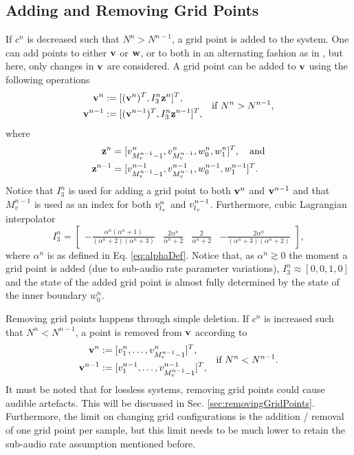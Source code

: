 \documentclass[fleqn]{jaes}
\begin{document}
\subsection{Adding and Removing Grid Points}\label{sec:addRemove}
If $c^n$ is decreased such that $N^n > N^{n-1}$, a grid point is added to the system. One can add points to either $\mathbf{v}$ or $\mathbf{w}$, or to both in an alternating fashion as in \cite{Willemsen2021a}, but here, only changes in $\mathbf{v}$ are considered. A grid point can be added to $\mathbf{v}$ using the following operations
\begin{equation}
\begin{aligned}
    \v^n &:= [(\v^n)^T, I_3^n\z^n]^T,\\
    \v^{n-1} &:= [(\v^{n-1})^T, I_3^n\z^{n-1}]^T,\\
\end{aligned} \quad \text{if } N^n > N^{n-1},
\end{equation}
where
\begin{equation*}
    \begin{aligned}
        \z^n &= [v_{M_v^{n-1}-1}^n, v_{M_v^{n-1}}^n, w_0^n, w_1^n]^T, \quad \text{and}\\
        \z^{n-1} &= [v_{M_v^{n-1}-1}^{n-1}, v_{M_v^{n-1}}^{n-1}, w_0^{n-1}, w_1^{n-1}]^T.
    \end{aligned}
\end{equation*}
Notice that $I_3^n$ is used for adding a grid point to both $\mathbf{v}^n$ and $\mathbf{v}^{n-1}$ and that $M_v^{n-1}$ is used as an index for both $v^n_{l_v}$ and $v^{n-1}_{l_v}$.
Furthermore, cubic Lagrangian interpolator
\begin{equation}\label{eq:customIp}
    I_3^n = \begin{bmatrix} -\frac{\alpha^n(\alpha^n+1)}{(\alpha^n+2)(\alpha^n+3)} &\frac{2\alpha^n}{\alpha^n+2} &\frac{2}{\alpha^n+2} 
    &-\frac{2\alpha^n}{(\alpha^n+3)(\alpha^n+2)}
    \end{bmatrix},
\end{equation}
where $\alpha^n$ is as defined in Eq. \eqref{eq:alphaDef}. Notice that, as $\alpha^n \gtrsim 0$ the moment a grid point is added (due to sub-audio rate parameter variations), $I_3^n\approx [0, 0, 1, 0]$ and the state of the added grid point is almost fully determined by the state of the inner boundary $w_0^n$. 

Removing grid points happens through simple deletion. If $c^n$ is increased such that $N^n < N^{n-1}$, a point is removed from $\mathbf{v}$ according to
\begin{equation}\label{eq:removePoint}
\begin{aligned}
    \v^n &:= [v_1^n, \hdots, v_{M_v^{n-1}-1}^n]^T,\\
    \v^{n-1} &:= [v_1^{n-1}, \hdots, v_{M_v^{n-1}-1}^{n-1}]^T,
    \end{aligned} \quad \text{if } N^n < N^{n-1}.
\end{equation}
It must be noted that for lossless systems, removing grid points could cause audible artefacts. This will be discussed in Sec. \ref{sec:removingGridPoints}. Furthermore, the limit on changing grid configurations is the addition / removal of one grid point per sample, but this limit needs to be much lower to retain the sub-audio rate assumption mentioned before. 
\end{document}
